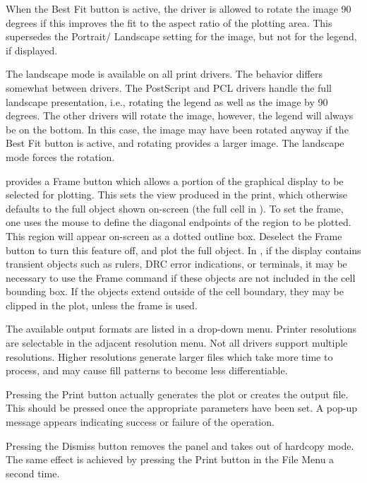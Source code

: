 When the {\cb Best Fit} button is active, the driver is allowed to
rotate the image 90 degrees if this improves the fit to the aspect
ratio of the plotting area.  This supersedes the {\cb Portrait}/{\cb
Landscape} setting for the image, but not for the legend, if
displayed.

The landscape mode is available on all print drivers.  The behavior
differs somewhat between drivers.  The PostScript and PCL drivers
handle the full landscape presentation, i.e., rotating the legend as
well as the image by 90 degrees.  The other drivers will rotate the
image, however, the legend will always be on the bottom.  In this
case, the image may have been rotated anyway if the {\cb Best Fit}
button is active, and rotating provides a larger image.  The landscape
mode forces the rotation.

{\Xic} provides a {\cb Frame} button which allows a portion of the
graphical display to be selected for plotting.  This sets the view
produced in the print, which otherwise defaults to the full object
shown on-screen (the full cell in {\Xic}).  To set the frame, one uses
the mouse to define the diagonal endpoints of the region to be
plotted.  This region will appear on-screen as a dotted outline box. 
Deselect the {\cb Frame} button to turn this feature off, and plot the
full object.  In {\Xic}, if the display contains transient objects
such as rulers, DRC error indications, or terminals, it may be
necessary to use the {\cb Frame} command if these objects are not
included in the cell bounding box.  If the objects extend outside of
the cell boundary, they may be clipped in the plot, unless the frame
is used.

The available output formats are listed in a drop-down menu.  Printer
resolutions are selectable in the adjacent resolution menu.  Not all
drivers support multiple resolutions.  Higher resolutions generate
larger files which take more time to process, and may cause fill
patterns to become less differentiable.

Pressing the {\cb Print} button actually generates the plot or creates
the output file.  This should be pressed once the appropriate
parameters have been set.  A pop-up message appears indicating success
or failure of the operation.

Pressing the {\cb Dismiss} button removes the panel and takes {\Xic}
out of hardcopy mode.  The same effect is achieved by
pressing the {\cb Print} button in the {\cb File Menu} a second time. 


